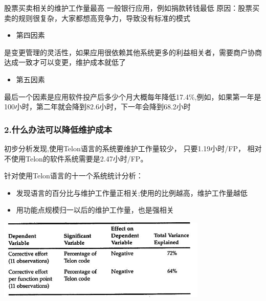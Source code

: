 股票买卖相关的维护工作量最高 一般银行应用，例如捐款转钱最低
原因：股票买卖的规则很复杂，大家都想高竞争力，导致没有标准的模式

\begin{itemize}
\tightlist
\item
  第四因素\\
\end{itemize}

是变更管理的灵活性，如果应用很依赖其他系统更多的利益相关者，需要商户协商达成一致才可以变更，维护成本就低了

\begin{itemize}
\tightlist
\item
  第五因素\\
\end{itemize}

最后一个因素是应用软件投产后多少个月大概每年降低17.4\%,例如，如果第一年是100小时，第二年就会降到82.6小时，下一年会降到68.2小时

\hypertarget{ux4ec0ux4e48ux529eux6cd5ux53efux4ee5ux964dux4f4eux7ef4ux62a4ux6210ux672c}{%
\subsubsection{2.什么办法可以降低维护成本}\label{ux4ec0ux4e48ux529eux6cd5ux53efux4ee5ux964dux4f4eux7ef4ux62a4ux6210ux672c}}

初步分析发现,使用Telon语言的系统要维护工作量较少， 只要1.19小时/FP，
相对不使用Telon的软件系统需要是2.47小时/FP。

针对使用Telon语言的十一个系统统计分析：

\begin{itemize}
\tightlist
\item
  发现语言的百分比与维护工作量正相关;使用的比例越高，维护工作量越低
\item
  用功能点规模归一以后的维护工作量，也是强相关
\end{itemize}


\includegraphics[width=10cm]{maxwell_t56.jpg}


